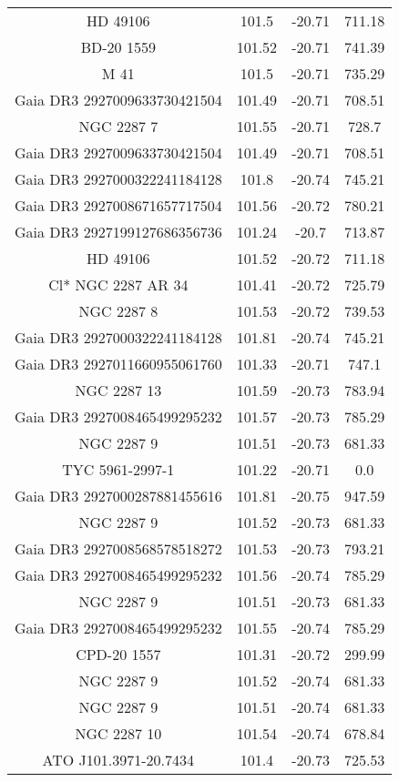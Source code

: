 \begin{table}
\begin{tabular}{cccc}
HD  49106 & 101.5 & -20.71 & 711.18 \\
BD-20  1559 & 101.52 & -20.71 & 741.39 \\
M  41 & 101.5 & -20.71 & 735.29 \\
Gaia DR3 2927009633730421504 & 101.49 & -20.71 & 708.51 \\
NGC  2287     7 & 101.55 & -20.71 & 728.7 \\
Gaia DR3 2927009633730421504 & 101.49 & -20.71 & 708.51 \\
Gaia DR3 2927000322241184128 & 101.8 & -20.74 & 745.21 \\
Gaia DR3 2927008671657717504 & 101.56 & -20.72 & 780.21 \\
Gaia DR3 2927199127686356736 & 101.24 & -20.7 & 713.87 \\
HD  49106 & 101.52 & -20.72 & 711.18 \\
Cl* NGC 2287     AR      34 & 101.41 & -20.72 & 725.79 \\
NGC  2287     8 & 101.53 & -20.72 & 739.53 \\
Gaia DR3 2927000322241184128 & 101.81 & -20.74 & 745.21 \\
Gaia DR3 2927011660955061760 & 101.33 & -20.71 & 747.1 \\
NGC  2287    13 & 101.59 & -20.73 & 783.94 \\
Gaia DR3 2927008465499295232 & 101.57 & -20.73 & 785.29 \\
NGC  2287     9 & 101.51 & -20.73 & 681.33 \\
TYC 5961-2997-1 & 101.22 & -20.71 & 0.0 \\
Gaia DR3 2927000287881455616 & 101.81 & -20.75 & 947.59 \\
NGC  2287     9 & 101.52 & -20.73 & 681.33 \\
Gaia DR3 2927008568578518272 & 101.53 & -20.73 & 793.21 \\
Gaia DR3 2927008465499295232 & 101.56 & -20.74 & 785.29 \\
NGC  2287     9 & 101.51 & -20.73 & 681.33 \\
Gaia DR3 2927008465499295232 & 101.55 & -20.74 & 785.29 \\
CPD-20  1557 & 101.31 & -20.72 & 299.99 \\
NGC  2287     9 & 101.52 & -20.74 & 681.33 \\
NGC  2287     9 & 101.51 & -20.74 & 681.33 \\
NGC  2287    10 & 101.54 & -20.74 & 678.84 \\
ATO J101.3971-20.7434 & 101.4 & -20.73 & 725.53 \\

\end{tabular}
\end{table}
